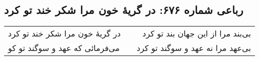 \begin{center}
\section*{رباعی شماره ۶۷۶: در گریهٔ خون مرا شکر خند تو کرد}
\label{sec:0676}
\begin{longtable}{l p{0.5cm} r}
در گریهٔ خون مرا شکر خند تو کرد
&&
بی‌بند مرا از این جهان بند تو کرد
\\
می‌فرمائی که عهد و سوگند تو کو
&&
بی‌عهد مرا نه عهد و سوگند تو کرد
\\
\end{longtable}
\end{center}

